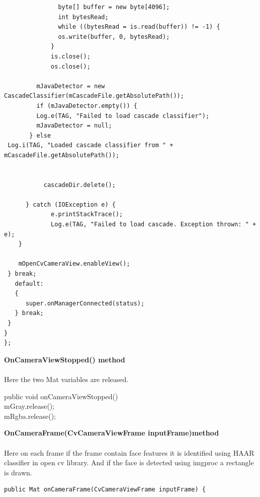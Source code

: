 \documentclass[11pt,a4paper,twoside]{report}
\begin{document}
\begin{appendix}
\begin{flushleft}
\begin{small}
\begin{lstlisting}
               byte[] buffer = new byte[4096];
               int bytesRead;
               while ((bytesRead = is.read(buffer)) != -1) {
               os.write(buffer, 0, bytesRead);
             }
             is.close();
             os.close();

         mJavaDetector = new CascadeClassifier(mCascadeFile.getAbsolutePath());
         if (mJavaDetector.empty()) {
         Log.e(TAG, "Failed to load cascade classifier");
         mJavaDetector = null;
       } else
 Log.i(TAG, "Loaded cascade classifier from " + mCascadeFile.getAbsolutePath());


           cascadeDir.delete();

      } catch (IOException e) {
             e.printStackTrace();
             Log.e(TAG, "Failed to load cascade. Exception thrown: " + e);
    }

    mOpenCvCameraView.enableView();
 } break;
   default:
   {
      super.onManagerConnected(status);
   } break;
 }
}
};

\end{lstlisting}
\end{small}
\end{flushleft}
\begin{flushleft}
\textbf{OnCameraViewStopped() method}\\

\end{flushleft}
\paragraph{ }Here the two Mat variables are released.

\begin{flushleft}
\begin{flushleft}

\end{flushleft}
public void onCameraViewStopped() {\\
    mGray.release();\\
    mRgba.release();\\
}
\end{flushleft}

\newpage
\begin{flushleft}
\textbf{OnCameraFrame(CvCameraViewFrame inputFrame)method}
\end{flushleft}
\paragraph{ }Here on each frame if the frame contain face features it is identified using HAAR classifier in open cv library. And if the face is detected using imgproc a rectangle is drawn.
\begin{flushleft}
\begin{tiny}
\begin{lstlisting}
public Mat onCameraFrame(CvCameraViewFrame inputFrame) {


\end{lstlisting}
\end{tiny}
\end{flushleft}
\end{appendix}
\end{document}

